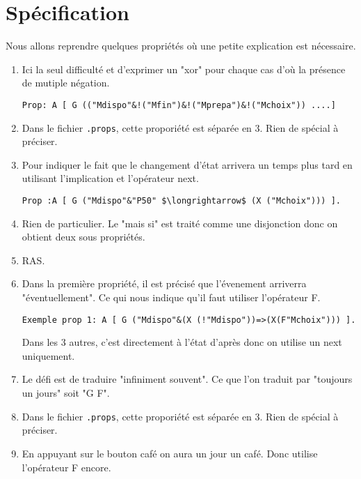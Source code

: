 \documentclass{article}
\begin{document}
\clearpage

\section{Spécification}
Nous allons reprendre quelques propriétés où une petite explication est nécessaire.
\begin{enumerate}
    \item Ici la seul difficulté et d'exprimer un "xor" pour chaque cas d'où la présence de mutiple négation.
\begin{verbatim}
Prop: A [ G (("Mdispo"&!("Mfin")&!("Mprepa")&!("Mchoix")) ....]
\end{verbatim}
    \item Dans le fichier \texttt{.props}, cette proporiété est séparée en 3. 
        Rien de spécial à préciser. 
    \item Pour indiquer le fait que le changement d'état arrivera un temps plus tard en utilisant l'implication et l'opérateur next.
\begin{verbatim}
Prop :A [ G ("Mdispo"&"P50" $\longrightarrow$ (X ("Mchoix"))) ].
\end{verbatim}
    \item Rien de particulier. Le "mais si" est traité comme une disjonction donc on obtient deux sous propriétés.
    \item RAS.
    \item Dans la première propriété, il est précisé que l'évenement arriverra "éventuellement". Ce qui nous indique qu'il faut utiliser l'opérateur F.
\begin{verbatim}
Exemple prop 1: A [ G ("Mdispo"&(X (!"Mdispo"))=>(X(F"Mchoix"))) ].
\end{verbatim}
    Dans les 3 autres, c'est directement à l'état d'après donc on utilise un next uniquement.
    \item Le défi est de traduire "infiniment souvent". Ce que l'on traduit par "toujours un jours" soit "G F". 
    \item Dans le fichier \texttt{.props}, cette proporiété est séparée en 3. 
    Rien de spécial à préciser. 
    \item En appuyant sur le bouton café on aura un jour un café. Donc utilise l'opérateur F encore. 
\end{enumerate}
\end{document}
